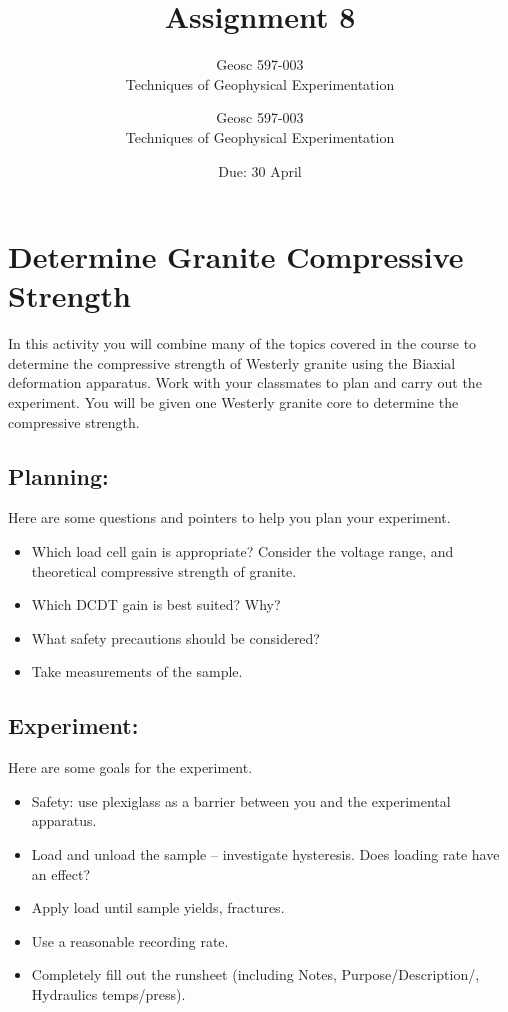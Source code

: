 \documentclass[10pt]{article}
\title{Assignment #1} %
\author{Geosc 597-003 \\
		Techniques of Geophysical Experimentation} %
\date{Due: #2}
\newcommand{\titler}[2]{
	\title{Assignment #1} %
	\author{Geosc 597-003 \\
		Techniques of Geophysical Experimentation} %
	\date{Due: #2}
	
	\maketitle}
\begin{document}

\titler{8}{30 April}

\section*{Determine Granite Compressive Strength}

In this activity you will combine many of the topics covered in the course to determine the compressive strength of Westerly granite using the Biaxial deformation apparatus. Work with your classmates to plan and carry out the experiment. You will be given one Westerly granite core to determine the compressive strength.


\subsection*{Planning:}
Here are some questions and pointers to help you plan your experiment. 
\begin{itemize}
	\item Which load cell gain is appropriate? Consider the voltage range, and theoretical compressive strength of granite.
	\item Which DCDT gain is best suited? Why?
	\item What safety precautions should be considered?
	\item Take measurements of the sample.
\end{itemize}


\subsection*{Experiment:}
Here are some goals for the experiment.
\begin{itemize}
	\item Safety: use plexiglass as a barrier between you and the experimental apparatus. 
	\item Load and unload the sample -- investigate hysteresis. Does loading rate have an effect?
	\item Apply load until sample yields, fractures. 
	\item Use a reasonable recording rate. 
	\item Completely fill out the runsheet (including Notes, Purpose/Description/, Hydraulics temps/press).
\end{itemize}
\end{document}
